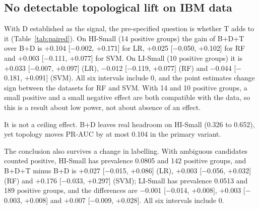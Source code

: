 \documentclass[conference]{IEEEtran}
\newcommand{\mi}{\ensuremath{-}}
\begin{document}
\subsection{No detectable topological lift on IBM data}
With D established as the signal, the pre-specified question is whether T adds to it (Table~\ref{tab:paired}). On HI-Small (14 positive groups) the gain of B+D+T over B+D is +0.104 [\mi0.002, +0.171] for LR, +0.025 [\mi0.050, +0.102] for RF and +0.003 [\mi0.111, +0.077] for SVM. On LI-Small (10 positive groups) it is +0.033 [\mi0.007, +0.097] (LR), \mi0.012 [\mi0.119, +0.077] (RF) and \mi0.044 [\mi0.181, +0.091] (SVM). All six intervals include 0, and the point estimates change sign between the datasets for RF and SVM. With 14 and 10 positive groups, a small positive and a small negative effect are both compatible with the data, so this is a result about low power, not about absence of an effect.

It is not a ceiling effect. B+D leaves real headroom on HI-Small (0.326 to 0.652), yet topology moves PR-AUC by at most 0.104 in the primary variant.

The conclusion also survives a change in labelling. With ambiguous candidates counted positive, HI-Small has prevalence 0.0805 and 142 positive groups, and B+D+T minus B+D is +0.027 [\mi0.015, +0.086] (LR), +0.003 [\mi0.056, +0.032] (RF) and +0.176 [\mi0.033, +0.297] (SVM); LI-Small has prevalence 0.0513 and 189 positive groups, and the differences are \mi0.001 [\mi0.014, +0.008], +0.003 [\mi0.003, +0.008] and +0.007 [\mi0.009, +0.028]. All six intervals include 0.
\end{document}
